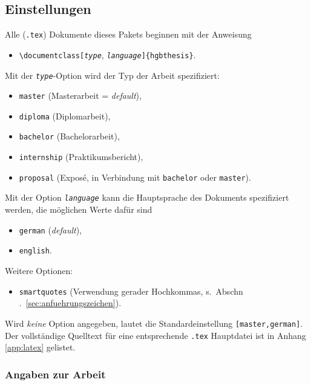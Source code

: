 \subsection{Einstellungen}
\label{sec:HagenbergEinstellungen}

Alle (\verb!.tex!) Dokumente dieses Pakets beginnen mit der Anweisung
%
\begin{itemize}
    \item[] \verb!\documentclass[!\texttt{\emph{type}},
    \texttt{\emph{language}}\verb!]{hgbthesis}!.
\end{itemize}
%
Mit der \texttt{\emph{type}}-Option wird der Typ der Arbeit spezifiziert:
%
\begin{itemize}
    \item[] \texttt{master} (Masterarbeit = \emph{default}),
    \item[] \texttt{diploma} (Diplomarbeit),
    \item[] \texttt{bachelor} (Bachelorarbeit),
    \item[] \texttt{internship} (Praktikumsbericht),
		\item[] \texttt{proposal} (Exposé, in Verbindung mit \texttt{bachelor} oder \texttt{master}).
\end{itemize}
%
Mit der Option \texttt{\emph{language}} kann die Hauptsprache des Dokuments
spezifiziert werden, die möglichen Werte dafür sind
%
\begin{itemize}
    \item[] \texttt{german} (\emph{default}),
    \item[] \texttt{english}.
\end{itemize}
%
Weitere Optionen:
%
\begin{itemize}
    \item[] \texttt{smartquotes} (Verwendung gerader Hochkommas, s.\ Abschn
    .~\ref{sec:anfuehrungszeichen}).
\end{itemize}
%
Wird \emph{keine} Option angegeben, lautet die Standardeinstellung
\texttt{[master,german]}. Der vollständige Quelltext für eine entsprechende
\verb!.tex! Hauptdatei ist in Anhang \ref{app:latex} gelistet.

\subsubsection{Angaben zur Arbeit}

